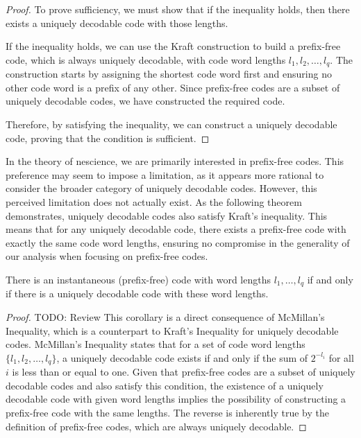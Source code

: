 \begin{proof}
To prove sufficiency, we must show that if the inequality holds, then there exists a uniquely decodable code with those lengths.

If the inequality holds, we can use the Kraft construction to build a prefix-free code, which is always uniquely decodable, with code word lengths \( l_1, l_2, \ldots, l_q \). The construction starts by assigning the shortest code word first and ensuring no other code word is a prefix of any other. Since prefix-free codes are a subset of uniquely decodable codes, we have constructed the required code.

Therefore, by satisfying the inequality, we can construct a uniquely decodable code, proving that the condition is sufficient.

\end{proof}

In the theory of nescience, we are primarily interested in prefix-free codes. This preference may seem to impose a limitation, as it appears more rational to consider the broader category of uniquely decodable codes. However, this perceived limitation does not actually exist. As the following theorem demonstrates, uniquely decodable codes also satisfy Kraft's inequality. This means that for any uniquely decodable code, there exists a prefix-free code with exactly the same code word lengths, ensuring no compromise in the generality of our analysis when focusing on prefix-free codes.

\begin{corollary}
There is an instantaneous (prefix-free) code with word lengths $l_1, \ldots, l_q$ if and only if there is a uniquely decodable code with these word lengths.
\end{corollary}
\begin{proof}
{\color{red} TODO: Review}
This corollary is a direct consequence of McMillan's Inequality, which is a counterpart to Kraft's Inequality for uniquely decodable codes. McMillan's Inequality states that for a set of code word lengths $\{l_1, l_2, \ldots, l_q\}$, a uniquely decodable code exists if and only if the sum of $2^{-l_i}$ for all $i$ is less than or equal to one. Given that prefix-free codes are a subset of uniquely decodable codes and also satisfy this condition, the existence of a uniquely decodable code with given word lengths implies the possibility of constructing a prefix-free code with the same lengths. The reverse is inherently true by the definition of prefix-free codes, which are always uniquely decodable.
\end{proof}

